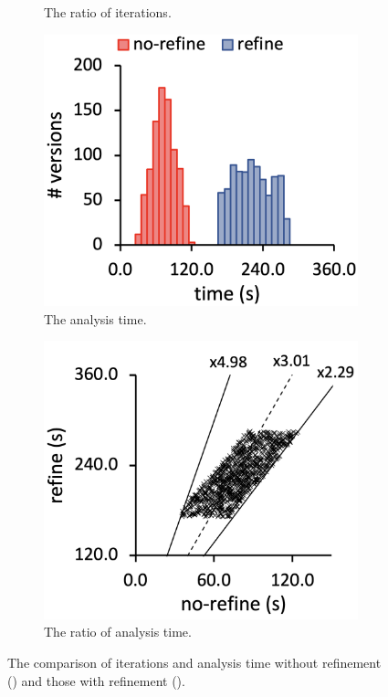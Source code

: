 \begin{figure}
\begin{subfigure}[b]{0.24\textwidth}
    \caption{The ratio of iterations.}
  \end{subfigure}
  \begin{subfigure}[b]{0.24\textwidth}
    \includegraphics[width=\textwidth]{img/compare-time}
    \caption{The analysis time.}
  \end{subfigure}
  \begin{subfigure}[b]{0.24\textwidth}
    \includegraphics[width=\textwidth]{img/ratio-time}
    \caption{The ratio of analysis time.}
  \end{subfigure}
  \caption{The comparison of iterations and analysis time without refinement
  () and those with refinement ().}
  \label{fig:performance-comp}
  \vspace*{-1.5em}
\end{figure}


